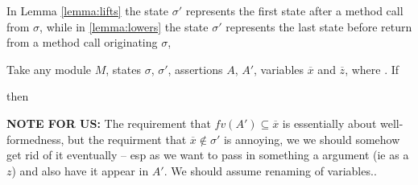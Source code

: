  

In Lemma \ref{lemma:lifts} the state $\sigma'$ represents the first state after a method call from  $\sigma$, while in \ref{lemma:lowers} the state $\sigma'$ represents the last state before return from a method call originating  $\sigma$, 

  \begin{lemma}
 \label{lemma:lifts}
Take any  module $M$, states $\sigma$, $\sigma'$, assertions $A$, $A'$,    variables $\overline x$ and $\overline z$, where
.
 If
 
 then
\end{lemma}


{\textbf{NOTE FOR US:} The requirement  that  $fv(A') \subseteq \overline x$  is essentially about well-formedness,  but the requirment that $ \overline x \notin \sigma'$ is annoying, we we should somehow get rid of it eventually -- esp as we want to pass in something a argument (ie as a $z$) and also have it appear in $A'$. We should assume renaming of variables..}

